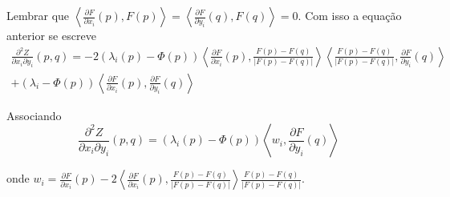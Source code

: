 \begin{demonstracao}
	Lembrar que $\left\langle \frac{\partial F}{\partial x_i}(p), F(p) \right\rangle = \left\langle \frac{\partial F}{\partial y_i}(q), F(q) \right\rangle = 0$. Com isso a equação anterior se escreve
	\begin{multline*}
	\frac{\partial^2 Z}{\partial x_i \partial y_i}(p,q) = -2 (\lambda_i(p) - \Phi(p)) \left\langle \frac{\partial F}{\partial x_i}(p), \frac{F(p) -F(q)}{|F(p) - F(q)|} \right\rangle \left\langle \frac{F(p) - F(q)}{|F(p) - F(q)|}, \frac{\partial F}{\partial y_i}(q) \right\rangle\\
	+ (\lambda_i - \Phi(p)) \left\langle \frac{\partial F}{\partial x_i}(p), \frac{\partial F}{\partial y_i}(q) \right\rangle
	\end{multline*}
	
	Associando
	\begin{equation*}
	\frac{\partial^2 Z}{\partial x_i \partial y_i}(p,q) = (\lambda_i(p) - \Phi(p))  \left\langle w_i , \frac{\partial F}{\partial y_i}(q) \right\rangle
	\end{equation*}
	
	onde $w_i = \frac{\partial F}{\partial x_i}(p)  -2 \left\langle \frac{\partial F}{\partial x_i}(p), \frac{F(p) -F(q)}{|F(p) - F(q)|} \right\rangle \frac{F(p) - F(q)}{|F(p) - F(q)|}$.
\end{demonstracao}



